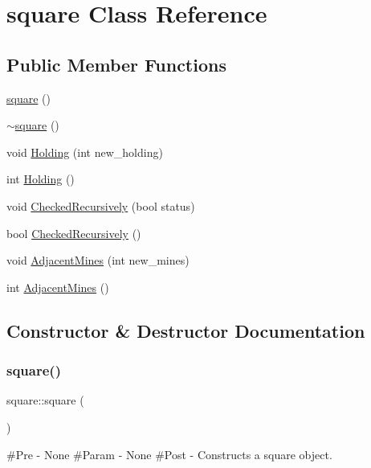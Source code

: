 \hypertarget{classsquare}{}\section{square Class Reference}
\label{classsquare}
\subsection*{Public Member Functions}
\begin{DoxyCompactItemize}
\item 
\mbox{\hyperlink{classsquare_ab244ecd9e1c5f467c2fa889d25d01766}{square}} ()
\item 
\mbox{\hyperlink{classsquare_ab29ccc5385134eb07dadb0ef0f3417b6}{$\sim$square}} ()
\item 
void \mbox{\hyperlink{classsquare_a1f8541dab03c453d7cfc0e95687b4056}{Holding}} (int new\+\_\+holding)
\item 
int \mbox{\hyperlink{classsquare_a891498f84fd9d6f4c412369fe51e7347}{Holding}} ()
\item 
void \mbox{\hyperlink{classsquare_a0a16171bace3d7e23c4b40bad476f32a}{Checked\+Recursively}} (bool status)
\item 
bool \mbox{\hyperlink{classsquare_acb16014b1e47b12b5f8e982d2c5a33f9}{Checked\+Recursively}} ()
\item 
void \mbox{\hyperlink{classsquare_a25e18a690d8096805b4ddcb97dbbf642}{Adjacent\+Mines}} (int new\+\_\+mines)
\item 
int \mbox{\hyperlink{classsquare_a168cd493b64467001a305ca1298b91f5}{Adjacent\+Mines}} ()
\end{DoxyCompactItemize}


\subsection{Constructor \& Destructor Documentation}
\mbox{\label{classsquare_ab244ecd9e1c5f467c2fa889d25d01766}} 
\subsubsection{\texorpdfstring{square()}{square()}}
{\footnotesize\ttfamily square\+::square (\begin{DoxyParamCaption}{ }\end{DoxyParamCaption})}

\#\+Pre -\/ None \#\+Param -\/ None \#\+Post -\/ Constructs a square object. \mbox{\label{classsquare_ab29ccc5385134eb07dadb0ef0f3417b6}} 
